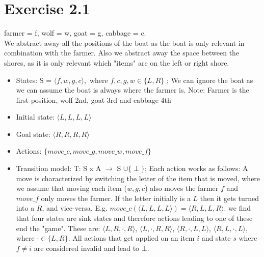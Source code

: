 \documentclass[12pt]{article}
\begin{document}
\section*{Exercise 2.1}
farmer = f, wolf = w, goat = g, cabbage = c.\\
We abstract away all the positions of the boat as the boat is only relevant in combination with the farmer. Also we abstract away the space between the shores, as it is only relevant which "items" are on the left or right shore.
\begin{itemize}
    \item States: S = $\langle f, w, g, c \rangle,$ where $f, c, g, w \in \{ L, R \}$ ; We can ignore the boat as we can assume the boat is always where the farmer is. Note: Farmer is the first position, wolf 2nd, goat 3rd and cabbage 4th 
    \item Initial state: $\langle L, L, L, L \rangle$ 
    \item Goal state: $\langle R, R, R, R \rangle$ 
    \item Actions: $\{ move\_c, move\_g, move\_w, move\_f\}$ 
    \item Transition model: T: S x A $\to$ S $\cup \{\perp \}$; Each action works as follows: A move is characterized by switching the letter of the item that is moved, where we assume that moving each item ($w,g,c$) also moves the farmer $f$ and $move\_f$ only moves the farmer. If the letter initially is a $L$ then it gets turned into a $R$, and vice-versa. E.g. $move\_c(\langle L, L, L, L \rangle) = \langle R, L, L, R \rangle$. we find that four states are sink states and therefore actions leading to one of these end the "game". These are: $\langle L, R, \cdot , R \rangle$, $\langle L, \cdot , R, R \rangle$, $\langle R, \cdot, L, L \rangle$, $\langle R, L, \cdot, L \rangle$, where $\cdot \in \{ L, R \}.$ All actions that get applied on an item $i$ and state $s$ where $f\neq i$ are considered invalid and lead to $\bot$.
\end{itemize}
\end{document}
